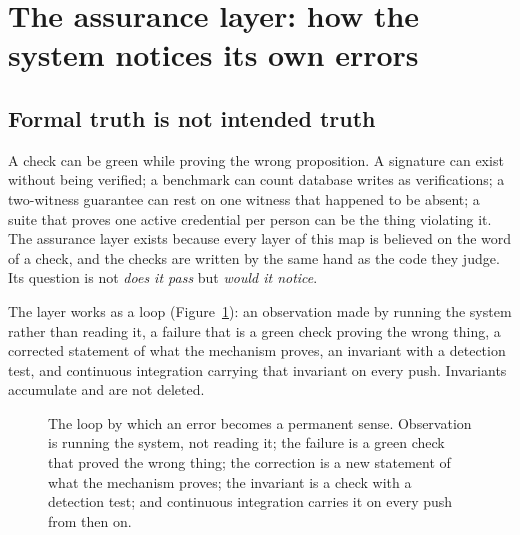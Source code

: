 \section{The assurance layer: how the system notices its own errors}
\label{sec:senses}



\subsection{Formal truth is not intended truth}

A check can be green while proving the wrong proposition. A signature can exist without being
verified; a benchmark can count database writes as verifications; a two-witness guarantee can rest on
one witness that happened to be absent; a suite that proves one active credential per person can be
the thing violating it. The assurance layer exists because every layer of this map is believed on the
word of a check, and the checks are written by the same hand as the code they judge. Its question is
not \emph{does it pass} but \emph{would it notice}.

The layer works as a loop (Figure~\ref{fig:senses-loop}): an observation made by running the system
rather than reading it, a failure that is a green check proving the wrong thing, a corrected
statement of what the mechanism proves, an invariant with a detection test, and continuous
integration carrying that invariant on every push. Invariants accumulate and are not deleted.

\begin{figure}[H]\centering
  \caption{The loop by which an error becomes a permanent sense. Observation is
running the system, not reading it; the failure is a green check that proved the wrong thing; the
correction is a new statement of what the mechanism proves; the invariant is a check with a detection
test; and continuous integration carries it on every push from then on.}\label{fig:senses-loop}\end{figure}

